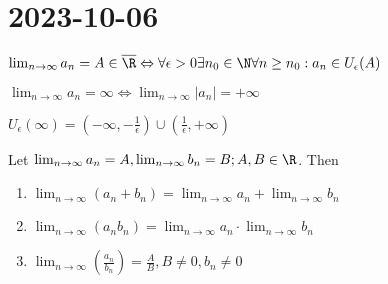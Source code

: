 \section{2023-10-06}

\begin{definition}[limit]
	$\lim_{n \to \infty} a_n = A \in \overline{\R} \Leftrightarrow  \forall \epsilon > 0 \exists n_0 \in \N \forall n \geq n_0: a_n \in U_\epsilon (A)$
\end{definition}

\begin{definition}[]
	$\lim_{n \to \infty} a_n = \infty \Leftrightarrow \lim_{n \to \infty} \left| a_n \right| = +\infty$ 

	$U_\epsilon (\infty) = (-\infty, -\frac{1}{\epsilon}) \cup (\frac{1}{\epsilon}, +\infty)$
\end{definition}

\begin{theorem}[]
	Let $\lim_{n \to \infty} a_n = A, \lim_{n \to \infty} b_n = B; A,B \in \R$. Then \begin{enumerate}
		\item $\lim_{n \to \infty} (a_n + b_n) = \lim_{n \to \infty} a_n + \lim_{n \to \infty} b_n$
		\item $\lim_{n \to \infty} (a_n b_n) = \lim_{n \to \infty} a_n \cdot  \lim_{n \to \infty} b_n$
		\item $\lim_{n \to \infty} (\frac{a_n}{b_n}) = \frac{A}{B}, B \neq 0, b_n \neq 0 $
	\end{enumerate}
\end{theorem}

